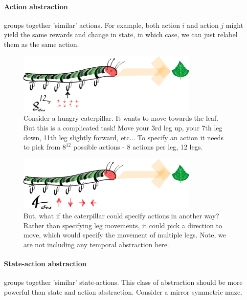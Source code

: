 \paragraph{Action abstraction} groups together 'similar' actions. For
example, both action $i$ and action $j$ might yield the same rewards and change in state,
in which case, we can just relabel them as the same action.

\begin{figure}[h!]
\centering
\includegraphics[width=0.8\textwidth,height=0.2\textheight]{../../pictures/drawings/hungry-caterpillar.png}
\caption{Consider a hungry caterpillar. It wants to move towards the leaf.
But this is a complicated task! Move your 3rd leg up, your 7th leg down, 11th leg slightly forward, etc...
To specify an action it needs to pick from $8^{12}$ possible actions - 8 actions per leg, 12 legs.}
\end{figure}


\begin{figure}[h!]
\centering
\includegraphics[width=0.8\textwidth,height=0.2\textheight]{../../pictures/drawings/full-caterpillar.png}
\caption{But, what if the caterpillar could specify actions in another way? Rather than specifying leg movements, it could pick a direction to move, which would specify the movement of multiple legs. Note, we are not including any temporal abstraction here.}
\end{figure}

\paragraph{State-action abstraction} groups together 'similar' state-actions.
This class of abstraction should be more powerful than state and action abstraction. Consider a mirror symmetric maze.

